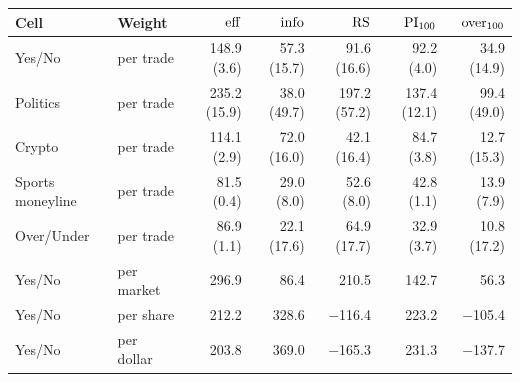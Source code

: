 \begin{tabular}{llrrrrr}
\toprule
Cell & Weight & $\mathrm{eff}$ & $\mathrm{info}$ & $\mathrm{RS}$ & $\mathrm{PI}_{100}$ & $\mathrm{over}_{100}$ \\
\midrule
Yes/No & per trade & 148.9 (3.6) & 57.3 (15.7) & 91.6 (16.6) & 92.2 (4.0) & 34.9 (14.9) \\
Politics & per trade & 235.2 (15.9) & 38.0 (49.7) & 197.2 (57.2) & 137.4 (12.1) & 99.4 (49.0) \\
Crypto & per trade & 114.1 (2.9) & 72.0 (16.0) & 42.1 (16.4) & 84.7 (3.8) & 12.7 (15.3) \\
Sports moneyline & per trade & 81.5 (0.4) & 29.0 (8.0) & 52.6 (8.0) & 42.8 (1.1) & 13.9 (7.9) \\
Over/Under & per trade & 86.9 (1.1) & 22.1 (17.6) & 64.9 (17.7) & 32.9 (3.7) & 10.8 (17.2) \\
\midrule
Yes/No & per market & 296.9 & 86.4 & 210.5 & 142.7 & 56.3 \\
Yes/No & per share & 212.2 & 328.6 & $-$116.4 & 223.2 & $-$105.4 \\
Yes/No & per dollar & 203.8 & 369.0 & $-$165.3 & 231.3 & $-$137.7 \\
\bottomrule
\end{tabular}
